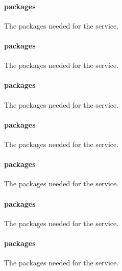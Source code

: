 \paragraph{packages}


The packages needed for the  service.

\paragraph{packages}


The packages needed for the  service.

\paragraph{packages}


The packages needed for the  service.

\paragraph{packages}


The packages needed for the  service.

\paragraph{packages}


The packages needed for the  service.

\paragraph{packages}


The packages needed for the  service.

\paragraph{packages}


The packages needed for the  service.

